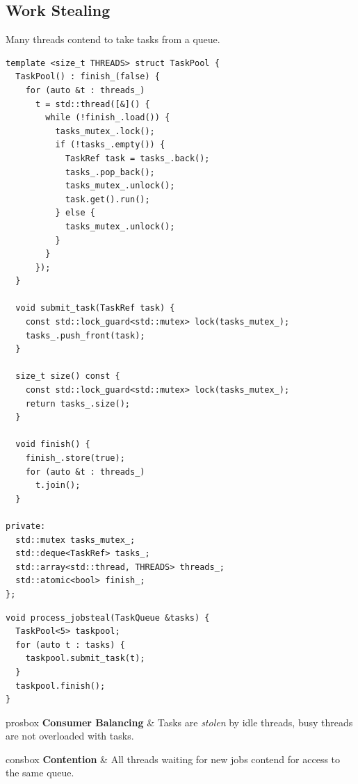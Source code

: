 \subsection{Work Stealing}
Many threads contend to take tasks from a queue.
\begin{verbatim}
template <size_t THREADS> struct TaskPool {
  TaskPool() : finish_(false) {
    for (auto &t : threads_)
      t = std::thread([&]() {
        while (!finish_.load()) {
          tasks_mutex_.lock();
          if (!tasks_.empty()) {
            TaskRef task = tasks_.back();
            tasks_.pop_back();
            tasks_mutex_.unlock();
            task.get().run();
          } else {
            tasks_mutex_.unlock();
          }
        }
      });
  }

  void submit_task(TaskRef task) {
    const std::lock_guard<std::mutex> lock(tasks_mutex_);
    tasks_.push_front(task);
  }

  size_t size() const {
    const std::lock_guard<std::mutex> lock(tasks_mutex_);
    return tasks_.size();
  }

  void finish() {
    finish_.store(true);
    for (auto &t : threads_)
      t.join();
  }

private:
  std::mutex tasks_mutex_;
  std::deque<TaskRef> tasks_;
  std::array<std::thread, THREADS> threads_;
  std::atomic<bool> finish_;
};
\end{verbatim}
\begin{verbatim}
void process_jobsteal(TaskQueue &tasks) {
  TaskPool<5> taskpool;
  for (auto t : tasks) {
    taskpool.submit_task(t);
  }
  taskpool.finish();
}
\end{verbatim}

\begin{tabbox}{prosbox}
    \textbf{Consumer Balancing} & Tasks are \textit{stolen} by idle threads, busy threads are not overloaded with tasks. \\
\end{tabbox}
\begin{tabbox}{consbox}
    \textbf{Contention} & All threads waiting for new jobs contend for access to the same queue. \\
\end{tabbox}


